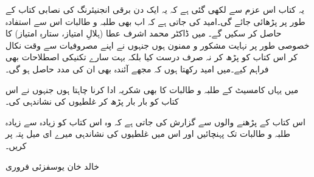 یہ کتاب اس عزم سے لکھی گئی ہے کہ یہ ایک دن برقی انجنیئرنگ کی نصابی کتاب کے طور پر پڑھائی جائے گی۔امید کی جاتی ہے کہ اب بھی طلبہ و طالبات اس سے استفادہ حاصل کر سکیں گے۔
میں ڈاکٹر محمد اشرف عطا (ہلالِ امتیاز، ستارہِ امتیاز) کا خصوصی طور پر نہایت مشکور و ممنون ہوں جنہوں نے اپنے مصروفیات سے وقت نکال کر اس کتاب کو پڑھ کر نہ صرف درست کیا بلکہ بہت سارے تکنیکی اصطلاحات بھی فراہم کیے۔میں امید رکھتا ہوں کہ مجھے  آئندہ بھی ان کی مدد حاصل ہو گی۔

میں یہاں کامسیٹ کے طلبہ و طالبات کا بھی شکریہ ادا کرنا چاہتا ہوں جنہوں نے اس کتاب کو بار بار پڑھ کر غلطیوں کی نشاندہی کی۔

اس کتاب کے پڑھنے والوں سے گزارش کی جاتی ہے کہ وہ اس کتاب کو زیادہ سے زیادہ طلبہ و طالبات تک پہنچائیں اور اس میں غلطیوں کی نشاندہی میرے ای میل پتہ پر کریں۔

خالد خان یوسفزئی
  فروری  
